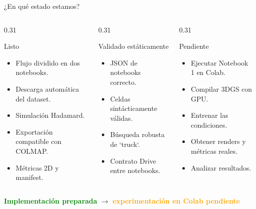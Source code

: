 \documentclass[aspectratio=169,11pt]{beamer}
\newcommand{\status}[2]{\textcolor{#1}{\textbf{#2}}}
\begin{document}
\begin{frame}{¿En qué estado estamos?}
\begin{columns}[T,onlytextwidth]
  \begin{column}{0.31\textwidth}
    \begin{block}{Listo}
      \begin{itemize}
        \item Flujo dividido en dos notebooks.
        \item Descarga automática del dataset.
        \item Simulación Hadamard.
        \item Exportación compatible con COLMAP.
        \item Métricas 2D y manifest.
      \end{itemize}
    \end{block}
  \end{column}
  \begin{column}{0.31\textwidth}
    \begin{block}{Validado estáticamente}
      \begin{itemize}
        \item JSON de notebooks correcto.
        \item Celdas sintácticamente válidas.
        \item Búsqueda robusta de `truck`.
        \item Contrato Drive entre notebooks.
      \end{itemize}
    \end{block}
  \end{column}
  \begin{column}{0.31\textwidth}
    \begin{block}{Pendiente}
      \begin{itemize}
        \item Ejecutar Notebook 1 en Colab.
        \item Compilar 3DGS con GPU.
        \item Entrenar las condiciones.
        \item Obtener renders y métricas reales.
        \item Analizar resultados.
      \end{itemize}
    \end{block}
  \end{column}
\end{columns}
\vfill
\centering
\status{green}{Implementación preparada} \hspace{1em} $\rightarrow$ \hspace{1em}
\status{orange}{experimentación en Colab pendiente}
\end{frame}
\end{document}
